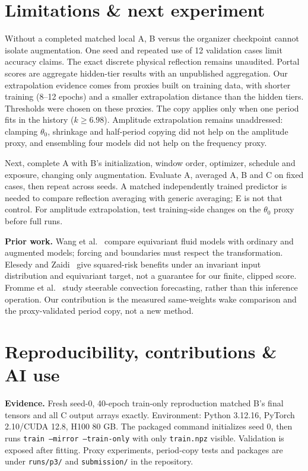 \documentclass{article}
\begin{document}
\newpage
\section{Limitations \& next experiment}

Without a completed matched local A, B versus the organizer checkpoint
cannot isolate augmentation.
One seed and repeated use of 12 validation cases limit accuracy claims.
The exact discrete physical reflection remains unaudited.
Portal scores are aggregate hidden-tier results with an unpublished
aggregation. Our extrapolation evidence comes from proxies built on
training data, with shorter training (8--12 epochs) and a smaller
extrapolation distance than the hidden tiers. Thresholds were chosen
on these proxies. The copy applies only when one period fits in the
history ($k\ge6.98$). Amplitude extrapolation remains unaddressed:
clamping $\theta_0$, shrinkage and half-period copying did not help on
the amplitude proxy, and ensembling four models did not help on the
frequency proxy.

Next, complete A with B's initialization, window order, optimizer,
schedule and exposure, changing only augmentation.
Evaluate A, averaged A, B and C on fixed cases, then repeat across seeds.
A matched independently trained predictor is needed to compare
reflection averaging with generic averaging; E is not that control.
For amplitude extrapolation, test training-side changes on the
$\theta_0$ proxy before full runs.

\medskip
\noindent\textbf{Prior work.}
Wang et al.~\citep{wang2021} compare equivariant fluid models with
ordinary and augmented models; forcing and boundaries must respect
the transformation.
Elesedy and Zaidi~\citep{elesedy2021} give squared-risk benefits under
an invariant input distribution and equivariant target, not a
guarantee for our finite, clipped score.
Fromme et al.~\citep{fromme2025} study steerable convection forecasting,
rather than this inference operation.
Our contribution is the measured same-weights wake comparison and the
proxy-validated period copy, not a new method.

\section{Reproducibility, contributions \& AI use}

\noindent\textbf{Evidence.}
Fresh seed-0, 40-epoch train-only reproduction matched B's final
tensors and all C output arrays exactly.
Environment: Python 3.12.16, PyTorch 2.10/CUDA 12.8, H100 80 GB.
The packaged command initializes seed 0, then runs
\texttt{train --mirror --train-only} with only \texttt{train.npz}
visible. Validation is exposed after fitting.
Proxy experiments, period-copy tests and packages are under
\texttt{runs/p3/} and \texttt{submission/} in the repository.
\end{document}
